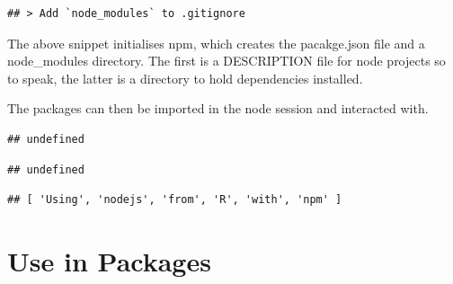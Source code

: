 \documentclass[
]{krantz}
\makeatletter
\newenvironment{Shaded}{\begin{snugshade}}{\end{snugshade}}
\newcommand{\KeywordTok}[1]{\textcolor[rgb]{0.27,0.27,0.27}{\textbf{#1}}}
\newcommand{\NormalTok}[1]{#1}
\newcommand{\OperatorTok}[1]{\textcolor[rgb]{0.43,0.43,0.43}{\textbf{#1}}}
\newcommand{\StringTok}[1]{\textcolor[rgb]{0.5,0.5,0.5}{#1}}
\newenvironment{kframe}{%
\medskip{}
\setlength{\fboxsep}{.8em}
 \def\at@end@of@kframe{}%
 \ifinner\ifhmode%
  \def\at@end@of@kframe{\end{minipage}}%
  \begin{minipage}{\columnwidth}%
 \fi\fi%
 \def\FrameCommand##1{\hskip\@totalleftmargin \hskip-\fboxsep
 \colorbox{shadecolor}{##1}\hskip-\fboxsep
     \hskip-\linewidth \hskip-\@totalleftmargin \hskip\columnwidth}%
 \MakeFramed {\advance\hsize-\width
   \@totalleftmargin\z@ \linewidth\hsize
   \@setminipage}}%
 {\par\unskip\endMakeFramed%
 \at@end@of@kframe}
\renewenvironment{Shaded}{\begin{kframe}}{\end{kframe}}
\makeatother
\begin{document}
\begin{verbatim}
## > Add `node_modules` to .gitignore
\end{verbatim}

The above snippet initialises npm, which creates the pacakge.json file and a node\_modules directory. The first is a DESCRIPTION file for node projects so to speak, the latter is a directory to hold dependencies installed.

The packages can then be imported in the node session and interacted with.

\begin{Shaded}
\end{Shaded}

\begin{verbatim}
## undefined
\end{verbatim}

\begin{Shaded}
\end{Shaded}

\begin{verbatim}
## undefined
\end{verbatim}

\begin{Shaded}
\end{Shaded}

\begin{verbatim}
## [ 'Using', 'nodejs', 'from', 'R', 'with', 'npm' ]
\end{verbatim}

\hypertarget{use-in-packages-1}{%
\section*{Use in Packages}\label{use-in-packages-1}}
\end{document}
